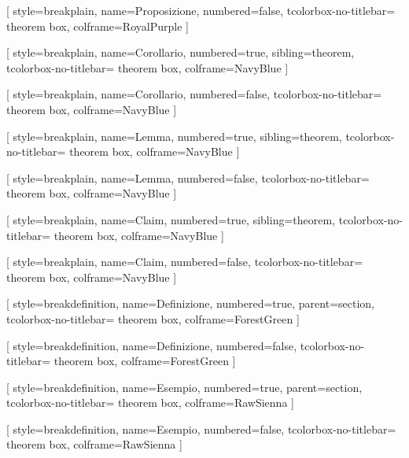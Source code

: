 [
    style=breakplain,
    name=Proposizione,
    numbered=false,
    tcolorbox-no-titlebar={
        theorem box,
        colframe=RoyalPurple
    }
]


[
    style=breakplain,
    name=Corollario,
    numbered=true,
    sibling=theorem,
    tcolorbox-no-titlebar={
        theorem box,
        colframe=NavyBlue
    }
]

[
    style=breakplain,
    name=Corollario,
    numbered=false,
    tcolorbox-no-titlebar={
        theorem box,
        colframe=NavyBlue
    }
]


[
    style=breakplain,
    name=Lemma,
    numbered=true,
    sibling=theorem,
    tcolorbox-no-titlebar={
        theorem box,
        colframe=NavyBlue
    }
]

[
    style=breakplain,
    name=Lemma,
    numbered=false,
    tcolorbox-no-titlebar={
        theorem box,
        colframe=NavyBlue
    }
]


[
    style=breakplain,
    name=Claim,
    numbered=true,
    sibling=theorem,
    tcolorbox-no-titlebar={
        theorem box,
        colframe=NavyBlue
    }
]

[
    style=breakplain,
    name=Claim,
    numbered=false,
    tcolorbox-no-titlebar={
        theorem box,
        colframe=NavyBlue
    }
]


[
    style=breakdefinition,
    name=Definizione,
    numbered=true,
    parent=section,
    tcolorbox-no-titlebar={
        theorem box,
        colframe=ForestGreen
    }
]

[
    style=breakdefinition,
    name=Definizione,
    numbered=false,
    tcolorbox-no-titlebar={
        theorem box,
        colframe=ForestGreen
    }
]


[
    style=breakdefinition,
    name=Esempio,
    numbered=true,
    parent=section,
    tcolorbox-no-titlebar={
        theorem box,
        colframe=RawSienna
    }
]

[
    style=breakdefinition,
    name=Esempio,
    numbered=false,
    tcolorbox-no-titlebar={
        theorem box,
        colframe=RawSienna
    }
]

